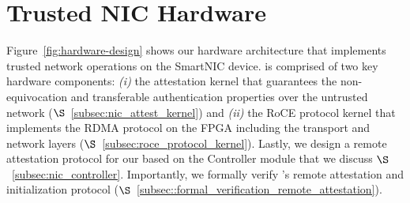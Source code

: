 \section{Trusted NIC Hardware}
\label{sec:t-nic-hardware}

Figure~\ref{fig:hardware-design} shows our \projecttitle{} hardware architecture that implements trusted network operations on the SmartNIC device. \projecttitle{} is comprised of two key hardware components: \emph{(i)} the attestation kernel that guarantees the non-equivocation and transferable authentication properties over the untrusted network ($\S$~\ref{subsec:nic_attest_kernel}) and \emph{(ii)} the RoCE protocol kernel that implements the RDMA protocol on the FPGA including the transport and network layers ($\S$~\ref{subsec:roce_protocol_kernel}). Lastly, we design a remote attestation protocol for our \projecttitle{} based on the \projecttitle{} Controller module that we discuss $\S$~\ref{subsec:nic_controller}. Importantly, we formally verify \projecttitle{}'s remote attestation and initialization protocol ($\S$~\ref{subsec::formal_verification_remote_attestation}).






